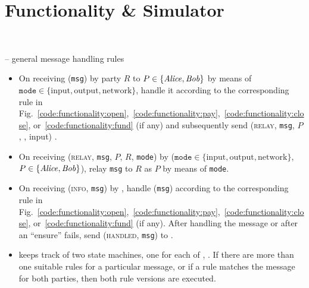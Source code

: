 \section{Functionality \& Simulator} \ \\
\label{sec:functionality}

\begin{center}
  \begin{systembox}{\fchan{} -- general message handling rules}
    \begin{itemize}
      \item On receiving (\texttt{msg}) by party $R$ to $P \in \{\mathit{Alice}, \mathit{Bob}\}$
      by means of $\texttt{mode} \in \{\mathrm{input}, \mathrm{output},
      \mathrm{network}\}$, handle it according to the corresponding rule in
      Fig.~\ref{code:functionality:open},~\ref{code:functionality:pay},~\ref{code:functionality:close},
      or~\ref{code:functionality:fund} (if any) and subsequently send
      (\textsc{relay}, \texttt{msg}, $P$, \environment, input) \adversary.
      \item On receiving (\textsc{relay}, \texttt{msg}, $P$, $R$, \texttt{mode})
      by \adversary ($\texttt{mode} \in \{\mathrm{input}, \mathrm{output},
      \mathrm{network}\}$, $P \in \{\mathit{Alice}, \mathit{Bob}\}$), relay \texttt{msg} to $R$
      as $P$ by means of \texttt{mode}. 
      \item On receiving (\textsc{info}, \texttt{msg}) by \adversary, handle
      (\texttt{msg}) according to the corresponding rule in
      Fig.~\ref{code:functionality:open},~\ref{code:functionality:pay},~\ref{code:functionality:close},
      or~\ref{code:functionality:fund} (if any). After handling the message or
      after an ``ensure'' fails, send (\textsc{handled}, \texttt{msg}) to
      \adversary. 
      \item \fchan keeps track of two state machines, one for each of \alice,
      \bob. If there are more than one suitable rules for a particular message,
      or if a rule matches the message for both parties, then both rule versions
      are executed. 
    \end{itemize}
  \end{systembox}
  \label{code:functionality:rules}
\end{center} \ \\

